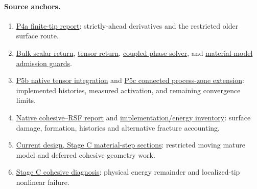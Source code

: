 \documentclass[10pt,a4paper]{article}
\begin{document}
\paragraph{Source anchors.}
\begin{enumerate}
\setlength{\itemsep}{1pt}
\setlength{\parskip}{0pt}
\item \href{https://github.com/YiminJin/aspect/blob/69e8a10a93a08718d31af961197899e320657c04/doc/reconstructed_fault/particle_free/P4A_TIP_REPORT.md}{P4a finite-tip report}:
strictly-ahead derivatives and the restricted older surface route.
\item \href{https://github.com/YiminJin/aspect/blob/69e8a10a93a08718d31af961197899e320657c04/source/material_model/phase_field_fault/bulk_cohesive.cc}{Bulk scalar return},
\href{https://github.com/YiminJin/aspect/blob/69e8a10a93a08718d31af961197899e320657c04/source/material_model/phase_field_fault/bulk_cohesive_tensor.cc}{tensor return},
\href{https://github.com/YiminJin/aspect/blob/69e8a10a93a08718d31af961197899e320657c04/source/simulator/solver/bulk_cohesive_phase.cc}{coupled phase solver}, and
\href{https://github.com/YiminJin/aspect/blob/69e8a10a93a08718d31af961197899e320657c04/source/material_model/phase_field_fault.cc}{material-model admission guards}.
\item \href{https://github.com/YiminJin/aspect/blob/69e8a10a93a08718d31af961197899e320657c04/doc/reconstructed_fault/particle_free/P5B_NATIVE_REPORT.md}{P5b native tensor integration} and
\href{https://github.com/YiminJin/aspect/blob/69e8a10a93a08718d31af961197899e320657c04/doc/reconstructed_fault/particle_free/P5C_CONTINUATION_REPORT.md}{P5c connected process-zone extension}:
implemented histories, measured activation, and remaining convergence limits.
\item \href{https://github.com/YiminJin/aspect/blob/69e8a10a93a08718d31af961197899e320657c04/doc/reconstructed_fault/particle_free/COHESIVE_RSF_NATIVE_REPORT.md}{Native cohesive--RSF report} and
\href{https://github.com/YiminJin/aspect/blob/69e8a10a93a08718d31af961197899e320657c04/doc/reconstructed_fault/particle_free/IMPLEMENTATION_MAPS.md}{implementation/energy inventory}:
surface damage, formation, histories and alternative fracture accounting.
\item \href{https://github.com/YiminJin/aspect/blob/69e8a10a93a08718d31af961197899e320657c04/doc/reconstructed_fault/current_design.md}{Current design, Stage C material-step sections}:
restricted moving mature model and deferred cohesive geometry work.
\item \href{https://github.com/YiminJin/aspect/blob/69e8a10a93a08718d31af961197899e320657c04/doc/reconstructed_fault/particle_free/STAGE_C_COHESIVE_DIAGNOSIS.md}{Stage C cohesive diagnosis}:
physical energy remainder and localized-tip nonlinear failure.
\end{enumerate}
\endgroup
\end{document}
